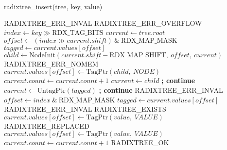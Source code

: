 \documentclass{article}
\begin{document}
\begin{algorithm}
  \caption{radixtree\_insert(tree, key, value)}
  \begin{algorithmic}[1]
    \State \Return RADIXTREE\_ERR\_INVAL
    \EndIf
    \State \Return RADIXTREE\_ERR\_OVERFLOW
    \EndIf
    \State $index \gets key \gg \mathrm{RDX\_TAG\_BITS}$
    \State $current \gets tree.root$
    \State $offset \gets (index \gg current.shift)\ \&\ \mathrm{RDX\_MAP\_MASK}$
    \State $tagged \gets current.values[offset]$
    \State $child \gets \mathrm{NodeInit}(current.shift - \mathrm{RDX\_MAP\_SHIFT},\ offset,\ current)$
     \State \Return RADIXTREE\_ERR\_NOMEM \EndIf
    \State $current.values[offset] \gets \mathrm{TagPtr}(child,\ NODE)$
    \State $current.count \gets current.count + 1$
    \State $current \gets child$ \textbf{; continue}
    \State $current \gets \mathrm{UntagPtr}(tagged)$ \textbf{; continue}
    \Else
    \State \Return RADIXTREE\_ERR\_INVAL
    \EndIf
    \EndWhile
    \State $offset \gets index\ \&\ \mathrm{RDX\_MAP\_MASK}$
    \State $tagged \gets current.values[offset]$
    \State \Return RADIXTREE\_ERR\_INVAL
    \EndIf
    \State \Return RADIXTREE\_EXISTS
    \EndIf
    \State $current.values[offset] \gets \mathrm{TagPtr}(value,\ VALUE)$
    \State \Return RADIXTREE\_REPLACED
    \EndIf
    \State $current.values[offset] \gets \mathrm{TagPtr}(value,\ VALUE)$
    \State $current.count \gets current.count + 1$
    \State \Return RADIXTREE\_OK
    \EndProcedure
  \end{algorithmic}
\end{algorithm}
\end{document}
